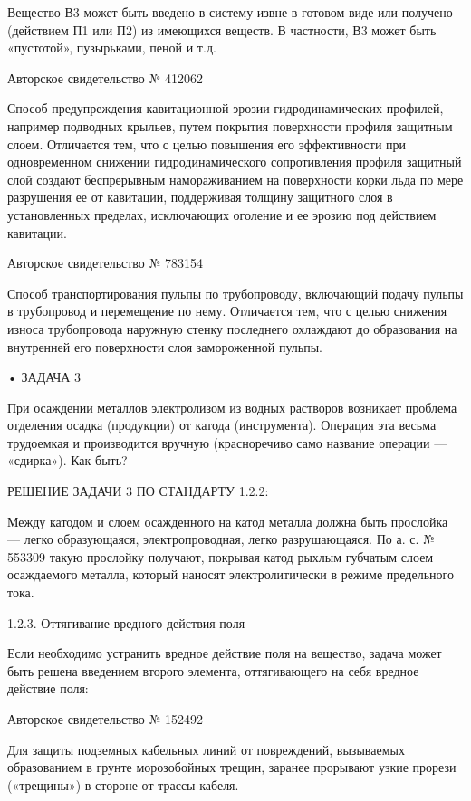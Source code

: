 Вещество В3  может быть  введено в  систему извне  в готовом  виде или
получено (действием П1  или П2) из имеющихся веществ.  В частности, В3
может быть «пустотой», пузырьками, пеной и т.д.

Авторское свидетельство № 412062

Способ    предупреждения   кавитационной    эрозии   гидродинамических
профилей,  например  подводных  крыльев,  путем  покрытия  поверхности
профиля  защитным  слоем.  Отличается   тем,  что  с  целью  повышения
его  эффективности   при  одновременном   снижении  гидродинамического
сопротивления    профиля    защитный   слой    создают    беспрерывным
намораживанием  на  поверхности  корки  льда  по  мере  разрушения  ее
от  кавитации,  поддерживая  толщину защитного  слоя  в  установленных
пределах, исключающих оголение и ее эрозию под действием кавитации.

Авторское свидетельство № 783154

Способ  транспортирования пульпы  по  трубопроводу, включающий  подачу
пульпы  в  трубопровод и  перемещение  по  нему. Отличается  тем,  что
с  целью  снижения  износа  трубопровода  наружную  стенку  последнего
охлаждают   до  образования   на  внутренней   его  поверхности   слоя
замороженной пульпы.


• ЗАДАЧА 3

При  осаждении металлов  электролизом  из  водных растворов  возникает
проблема  отделения   осадка  (продукции)  от   катода  (инструмента).
Операция эта  весьма трудоемкая  и производится  вручную (красноречиво
само название операции — «сдирка»). Как быть?

РЕШЕНИЕ ЗАДАЧИ 3 ПО СТАНДАРТУ 1.2.2:

Между  катодом  и  слоем  осажденного на  катод  металла  должна  быть
прослойка — легко образующаяся, электропроводная, легко разрушающаяся.
По  а. с.  № 553309  такую прослойку  получают, покрывая  катод рыхлым
губчатым слоем осаждаемого металла, который наносят электролитически в
режиме предельного тока.

1.2.3. Оттягивание вредного действия поля

Если необходимо  устранить вредное  действие поля на  вещество, задача
может быть  решена введением  второго элемента, оттягивающего  на себя
вредное действие поля:


Авторское свидетельство № 152492

Для  защиты  подземных  кабельных  линий  от  повреждений,  вызываемых
образованием  в грунте  морозобойных трещин,  заранее прорывают  узкие
прорези («трещины») в стороне от трассы кабеля.

